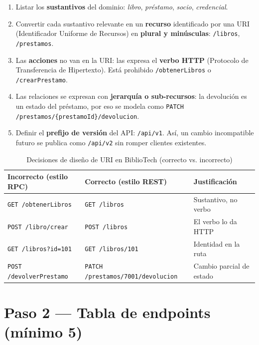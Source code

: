\documentclass[11pt,a4paper]{article}
\begin{document}
\begin{cajapaso}
\begin{enumerate}
  \item Listar los \textbf{sustantivos} del dominio: \textit{libro}, \textit{préstamo}, \textit{socio}, \textit{credencial}.
  \item Convertir cada sustantivo relevante en un \textbf{recurso} identificado por una URI (Identificador Uniforme de Recursos) en \textbf{plural y minúsculas}: \texttt{/libros}, \texttt{/prestamos}.
  \item Las \textbf{acciones} no van en la URI: las expresa el \textbf{verbo HTTP} (Protocolo de Transferencia de Hipertexto). Está prohibido \texttt{/obtenerLibros} o \texttt{/crearPrestamo}.
  \item Las relaciones se expresan con \textbf{jerarquía o sub-recursos}: la devolución es un estado del préstamo, por eso se modela como \texttt{PATCH /prestamos/\{prestamoId\}/devolucion}.
  \item Definir el \textbf{prefijo de versión} del API: \texttt{/api/v1}. Así, un cambio incompatible futuro se publica como \texttt{/api/v2} sin romper clientes existentes.
\end{enumerate}
\end{cajapaso}

\begin{table}[h!]
\centering
\caption{Decisiones de diseño de URI en BiblioTech (correcto vs. incorrecto)}
\begin{tabular}{p{5.2cm} p{5.2cm} p{4.2cm}}
\toprule
\textbf{Incorrecto (estilo RPC)} & \textbf{Correcto (estilo REST)} & \textbf{Justificación} \\
\midrule
\texttt{GET /obtenerLibros} & \texttt{GET /libros} & Sustantivo, no verbo \\
\texttt{POST /libro/crear} & \texttt{POST /libros} & El verbo lo da HTTP \\
\texttt{GET /libros?id=101} & \texttt{GET /libros/101} & Identidad en la ruta \\
\texttt{POST /devolverPrestamo} & \texttt{PATCH /prestamos/7001/devolucion} & Cambio parcial de estado \\
\bottomrule
\end{tabular}
\end{table}

\section{Paso 2 --- Tabla de endpoints (mínimo 5)}
\end{document}
